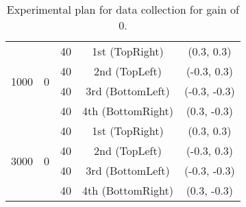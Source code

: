 \begin{table}[ht]
{\begin{tabular}{ccccc}
                \midrule

                \multirow{4}{*}{1000} & \multirow{4}{*}{0} & 40 & 1st (\textsf{TopRight}) & (0.3, 0.3) \\
                & & 40 & 2nd (\textsf{TopLeft}) & (-0.3, 0.3) \\
                & & 40 & 3rd (\textsf{BottomLeft}) & (-0.3, -0.3) \\
                & & 40 & 4th (\textsf{BottomRight}) & (0.3, -0.3) \\

                \midrule

                \multirow{4}{*}{3000} & \multirow{4}{*}{0} & 40 & 1st (\textsf{TopRight}) & (0.3, 0.3) \\
                & & 40 & 2nd (\textsf{TopLeft}) & (-0.3, 0.3) \\
                & & 40 & 3rd (\textsf{BottomLeft}) & (-0.3, -0.3) \\
                & & 40 & 4th (\textsf{BottomRight}) & (0.3, -0.3) \\
                \bottomrule
            \end{tabular}
            }
            \caption{Experimental plan for data collection for gain of 0.}
            \label{table:exp_plan_exposure_time}
        \end{table}

